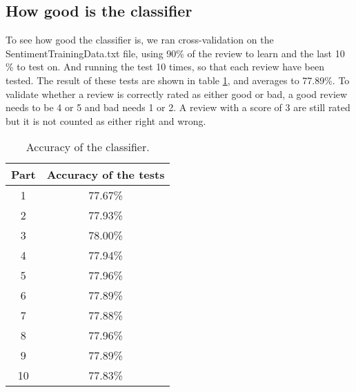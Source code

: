 \subsection{How good is the classifier}
To see how good the classifier is, we ran cross-validation on the SentimentTrainingData.txt file, using 90\% of the review to learn and the last 10 \% to test on. And running the test 10 times, so that each review have been tested. The result of these tests are shown in table \ref{tab:classifier-accuracy}, and averages to 77.89\%. To validate whether a review is correctly rated as either good or bad, a good review needs to be 4 or 5 and bad needs 1 or 2. A review with a score of 3 are still rated but it is not counted as either right and wrong.

\begin{table}
    \begin{tabular}{|c|c|}
        \hline 
        Part & Accuracy of the tests \\ 
        \hline 
        1 & 77.67\% \\ 
        \hline 
        2 & 77.93\% \\ 
        \hline 
        3 & 78.00\% \\ 
        \hline 
        4 & 77.94\% \\ 
        \hline 
        5 & 77.96\% \\ 
        \hline 
        6 & 77.89\% \\ 
        \hline 
        7 & 77.88\% \\ 
        \hline 
        8 & 77.96\% \\ 
        \hline 
        9 & 77.89\% \\ 
        \hline 
        10 & 77.83\% \\ 
        \hline 
    \end{tabular}
    \caption{Accuracy of the classifier.}
    \label{tab:classifier-accuracy}
\end{table}